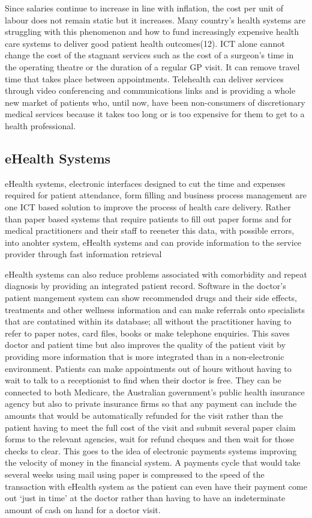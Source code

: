 Since salaries continue to increase in line with inflation, the cost per unit of labour does not remain static but it increases. Many country's health systems are struggling with this phenomenon and how to fund increasingly expensive health care systems to deliver good patient health outcomes(12). ICT alone cannot change the cost of the stagnant services such as the cost of a surgeon's time in the operating theatre or the duration of a regular GP visit. It can remove travel time that takes place between appointments. Telehealth can deliver services through video conferencing and communications links and is providing a whole new market of patients who, until now, have been non-consumers of discretionary medical services because it takes too long or is too expensive for them to get to a health professional. 

\subsection{eHealth Systems}
eHealth systems, electronic interfaces designed to cut the time and expenses required for patient attendance, form filling and business process management are one ICT based solution to improve the process of health care delivery. Rather than paper based systems that require patients to fill out paper forms and for medical practitioners and their staff to reeneter this data, with possible errors, into anohter system, eHealth systems and can provide information to the service provider through fast information retrieval 

eHealth systems can also reduce problems associated with comorbidity and repeat diagnosis by providing an integrated patient record. Software in the doctor's patient mangement system can show recommended drugs and their side effects, treatments and other wellness information and can make referrals onto specialists that are contatined within its database; all without the practitioner having to refer to paper notes, card files, books or make telephone enquiries. This saves doctor and patient time but also improves the quality of the patient visit by providing more information that is more integrated than in a non-electronic environment. Patients can make appointments out of hours without having to wait to talk to a receptionist to find when their doctor is free. They can be connected to both Medicare, the Australian government's public health insurance agency but also to private insurance firms so that any payment can include the amounts that would be automatically refunded for the visit rather than the patient having to meet the full cost of the visit and submit several paper claim forms to the relevant agencies, wait for refund cheques and then wait for those checks to clear. This goes to the idea of electronic payments systems improving the velocity of money in the financial system. A payments cycle that would take several weeks using mail using paper is compressed to the speed of the transaction with eHealth system as the patient can even have their payment come out `just in time' at the doctor rather than having to have an indeterminate amount of cash on hand for a doctor visit.

